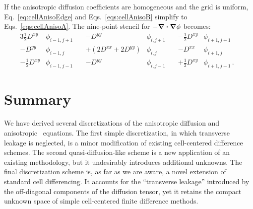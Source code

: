 If the anisotropic diffusion coefficients are homogeneous and the grid is
uniform, Eq.~\eqref{eq:cellAnisoEdge} and Eqs.~\eqref{eqs:cellAnisoB} simplify
to Eqs.~\eqref{eqs:cellAnisoA}. The nine-point stencil for $-\bm{\nabla} \bm{\cdot} \bm{\nabla}
\phi$ becomes:
\begin{alignat*}{3}
  \tfrac{1}{2}D^{xy} & \phi_{i-1,j+1} \quad&
             -D^{yy} & \phi_{i,j+1} \quad&
 -\tfrac{1}{2}D^{xy} & \phi_{i+1,j+1}\quad
\\
             -D^{yy} & \phi_{i-1,j} &
 +\left( 2D^{xx} + 2D^{yy} \right) & \phi_{i,j} &
             -D^{xx} & \phi_{i+1,j}
\\
 -\tfrac{1}{2}D^{xy} & \phi_{i-1,j-1} &
             -D^{yy} & \phi_{i,j-1} \quad&
  +\tfrac{1}{2}D^{xy} & \phi_{i+1,j-1} \,.
\end{alignat*}

\section{Summary}

We have derived several discretizations of the anisotropic diffusion and
anisotropic \Pone\ equations. The first simple discretization, in which
transverse
leakage is neglected, is a minor modification of existing cell-centered
difference schemes. The second quasi-diffusion-like scheme is a new application
of an existing methodology, but it undesirably introduces additional unknowns.
The final discretization scheme is, as far as we are aware, a novel extension of
standard cell differencing. It accounts for the ``transverse leakage''
introduced by the off-diagonal components of the diffusion tensor, yet it
retains the compact unknown space of simple cell-centered finite difference
methods.

